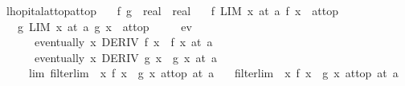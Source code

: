 \begin{isabellebody}
{\isafoldproof}%
%
\isadelimproof
\isanewline
%
\endisadelimproof
\isanewline
{}\isamarkupfalse%
\ lhopital{\isacharunderscore}{\kern0pt}at{\isacharunderscore}{\kern0pt}top{\isacharunderscore}{\kern0pt}at{\isacharunderscore}{\kern0pt}top{\isacharcolon}{\kern0pt}\isanewline
\ \ \ f\ g\ {\isacharcolon}{\kern0pt}{\isacharcolon}{\kern0pt}\ {\isachardoublequoteopen}real\ {\isasymRightarrow}\ real{\isachardoublequoteclose}\isanewline
\ \ \ f{\isacharunderscore}{\kern0pt}{}{\isacharcolon}{\kern0pt}\ {\isachardoublequoteopen}LIM\ x\ at\ a{\isachardot}{\kern0pt}\ f\ x\ {\isacharcolon}{\kern0pt}{\isachargreater}{\kern0pt}\ at{\isacharunderscore}{\kern0pt}top{\isachardoublequoteclose}\isanewline
\ \ \ g{\isacharunderscore}{\kern0pt}{}{\isacharcolon}{\kern0pt}\ {\isachardoublequoteopen}LIM\ x\ at\ a{\isachardot}{\kern0pt}\ g\ x\ {\isacharcolon}{\kern0pt}{\isachargreater}{\kern0pt}\ at{\isacharunderscore}{\kern0pt}top{\isachardoublequoteclose}\isanewline
\ \ \ \ \ ev{\isacharcolon}{\kern0pt}\isanewline
\ \ \ \ \ \ {\isachardoublequoteopen}eventually\ {\isacharparenleft}{\kern0pt}{\isasymlambda}x{\isachardot}{\kern0pt}\ DERIV\ f\ x\ {\isacharcolon}{\kern0pt}{\isachargreater}{\kern0pt}\ f{\isacharprime}{\kern0pt}\ x{\isacharparenright}{\kern0pt}\ {\isacharparenleft}{\kern0pt}at\ a{\isacharparenright}{\kern0pt}{\isachardoublequoteclose}\isanewline
\ \ \ \ \ \ {\isachardoublequoteopen}eventually\ {\isacharparenleft}{\kern0pt}{\isasymlambda}x{\isachardot}{\kern0pt}\ DERIV\ g\ x\ {\isacharcolon}{\kern0pt}{\isachargreater}{\kern0pt}\ g{\isacharprime}{\kern0pt}\ x{\isacharparenright}{\kern0pt}\ {\isacharparenleft}{\kern0pt}at\ a{\isacharparenright}{\kern0pt}{\isachardoublequoteclose}\isanewline
\ \ \ \ \ lim{\isacharcolon}{\kern0pt}\ {\isachardoublequoteopen}filterlim\ {\isacharparenleft}{\kern0pt}{\isasymlambda}\ x{\isachardot}{\kern0pt}\ {\isacharparenleft}{\kern0pt}f{\isacharprime}{\kern0pt}\ x\ {\isacharslash}{\kern0pt}\ g{\isacharprime}{\kern0pt}\ x{\isacharparenright}{\kern0pt}{\isacharparenright}{\kern0pt}\ at{\isacharunderscore}{\kern0pt}top\ {\isacharparenleft}{\kern0pt}at\ a{\isacharparenright}{\kern0pt}{\isachardoublequoteclose}\isanewline
\ \ \ {\isachardoublequoteopen}filterlim\ {\isacharparenleft}{\kern0pt}{\isasymlambda}\ x{\isachardot}{\kern0pt}\ f\ x\ {\isacharslash}{\kern0pt}\ g\ x{\isacharparenright}{\kern0pt}\ at{\isacharunderscore}{\kern0pt}top\ {\isacharparenleft}{\kern0pt}at\ a{\isacharparenright}{\kern0pt}{\isachardoublequoteclose}\isanewline

\end{isabellebody}
